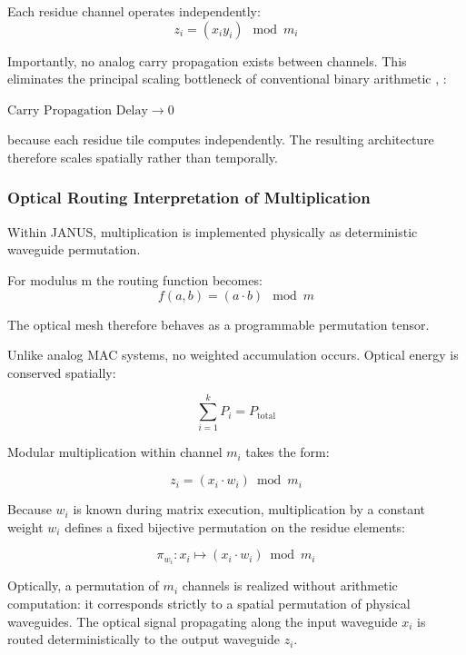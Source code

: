 \documentclass[journal]{IEEEtran}
\begin{document}
Each residue channel operates independently:
\begin{equation}
z_i = (x_iy_i) \mod m_i
\label{eq:modular_product}
\end{equation}

Importantly, no analog carry propagation exists between channels. This eliminates the principal scaling bottleneck of conventional binary arithmetic \cite{Omosanya2021}, \cite{Mohan2016}:

\begin{center}
$\text{Carry Propagation Delay} \rightarrow 0$
\end{center}

because each residue tile computes independently.
The resulting architecture therefore scales spatially rather than temporally.

\subsubsection{\textbf{Optical Routing Interpretation of Multiplication}}
Within JANUS, multiplication is implemented physically as deterministic waveguide permutation.

For modulus m the routing function becomes:
\begin{equation}
f (a, b) = (a \cdot b) \mod m
\end{equation}

The optical mesh therefore behaves as a programmable permutation tensor.

Unlike analog MAC systems, no weighted accumulation occurs. Optical energy is conserved spatially:

\begin{equation}
\sum_{i=1}^k P_i = P_{\mathrm{total}}
\end{equation}

Modular multiplication within channel $m_i$ takes the form:

\begin{equation}
z_i = (x_i \cdot w_i) \bmod m_i
\end{equation}

Because $w_i$ is known during matrix execution, multiplication by a constant weight $w_i$ defines a fixed bijective permutation on the residue elements:

\begin{equation}
\pi_{w_i}: x_i \mapsto (x_i \cdot w_i) \bmod m_i
\end{equation}

Optically, a permutation of $m_i$ channels is realized without arithmetic computation: it corresponds strictly to a spatial permutation of physical waveguides. The optical signal propagating along the input waveguide $x_i$ is routed deterministically to the output waveguide $z_i$.
\end{document}
